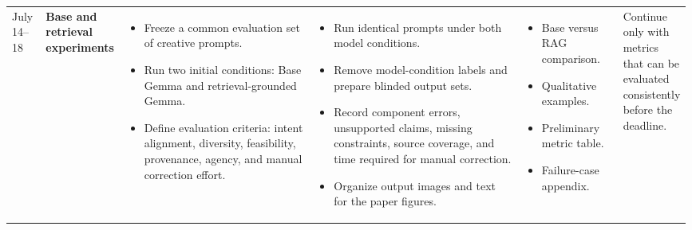 \documentclass{article}
\begin{document}
\begin{landscape}
\begin{longtable}{
    L{0.05\linewidth}
    L{0.08\linewidth}
    L{0.3\linewidth}
    L{0.33\linewidth}
    L{0.15\linewidth}
    L{0.08\linewidth}
}
July 14--18
&
\textbf{Base and retrieval experiments}
&
\begin{itemize}[leftmargin=*,nosep]
    \item Freeze a common evaluation set of creative prompts.
    \item Run two initial conditions:
    Base Gemma and retrieval-grounded Gemma.
    \item Define evaluation criteria:
    intent alignment, diversity, feasibility, provenance,
    agency, and manual correction effort.
\end{itemize}
&
\begin{itemize}[leftmargin=*,nosep]
    \item Run identical prompts under both model conditions.
    \item Remove model-condition labels and prepare blinded output sets.
    \item Record component errors, unsupported claims,
    missing constraints, source coverage, and time required for
    manual correction.
    \item Organize output images and text for the paper figures.
\end{itemize}
&
\begin{itemize}[leftmargin=*,nosep]
    \item Base versus RAG comparison.
    \item Qualitative examples.
    \item Preliminary metric table.
    \item Failure-case appendix.
\end{itemize}
&
Continue only with metrics that can be evaluated consistently
before the deadline.
\\


\end{longtable}
\end{landscape}
\end{document}
